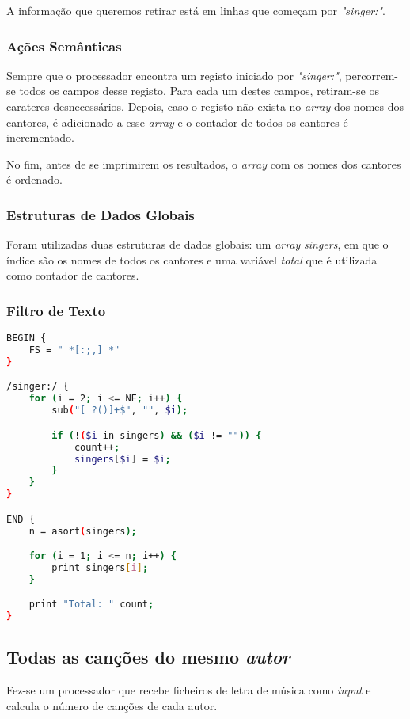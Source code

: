 \documentclass{article}
\begin{document}
A informação que queremos retirar está em linhas que começam por \emph{"singer:"}.

\subsubsection{Ações Semânticas}

Sempre que o processador encontra um registo iniciado por \emph{"singer:"}, percorrem-se todos os campos desse registo. Para cada um destes campos, retiram-se os carateres desnecessários. Depois, caso o registo não exista no \emph{array} dos nomes dos cantores, é adicionado a esse \emph{array} e o contador de todos os cantores é incrementado.

No fim, antes de se imprimirem os resultados, o \emph{array} com os nomes dos cantores é ordenado.

\subsubsection{Estruturas de Dados Globais}

Foram utilizadas duas estruturas de dados globais: um \emph{array} \emph{singers}, em que o índice são os nomes de todos os cantores e uma variável \emph{total} que é utilizada como contador de cantores.

\subsubsection{Filtro de Texto}

\begin{lstlisting}[language=bash]
BEGIN {
	FS = " *[:;,] *"
}

/singer:/ {
	for (i = 2; i <= NF; i++) {
	    sub("[ ?()]+$", "", $i);

	    if (!($i in singers) && ($i != "")) {
	    	count++;
	    	singers[$i] = $i;
	    }
	}
}

END {
	n = asort(singers);

	for (i = 1; i <= n; i++) {
		print singers[i];
	}

	print "Total: " count;
}
\end{lstlisting}


\subsection{Todas as canções do mesmo \emph{autor}}

Fez-se um processador que recebe ficheiros de letra de música como \emph{input} e calcula o número de canções de cada autor.
\end{document}
